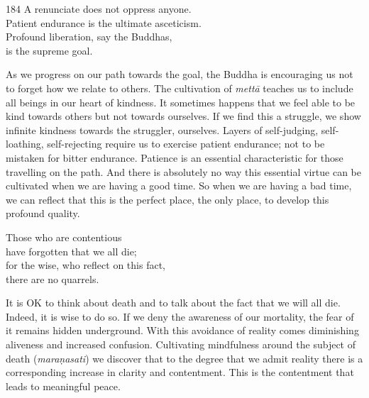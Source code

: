 
\begin{dhpVerse}{184}
\label{dhp-184}
A renunciate does not oppress anyone.\\
Patient endurance is the ultimate asceticism.\\
Profound liberation, say the Buddhas,\\
is the supreme goal.
\end{dhpVerse}

\begin{dhpRefl}

As we progress on our path towards the goal, the Buddha is
encouraging us not to forget how we relate to others. The
cultivation of \emph{mettā} teaches us to include all beings in our heart of
kindness. It sometimes happens that we feel able to be kind towards
others but not towards ourselves. If we find this a struggle, we show
infinite kindness towards the struggler, ourselves. Layers of
self-judging, self-loathing, self-rejecting require us to exercise
patient endurance; not to be mistaken for bitter endurance. Patience
is an essential characteristic for those travelling on the path. And
there is absolutely no way this essential virtue can be cultivated
when we are having a good time. So when we are having a bad time,
we can reflect that this is the perfect place, the only place, to develop
this profound quality.

\end{dhpRefl}


\begin{dhpVerse}{6}
\label{dhp-6}
Those who are contentious\\
have forgotten that we all die;\\
for the wise, who reflect on this fact,\\
there are no quarrels.
\end{dhpVerse}

\begin{dhpRefl}

It is OK to think about death and to talk about the fact that we will all
die. Indeed, it is wise to do so. If we deny the awareness of our
mortality, the fear of it remains hidden underground. With this
avoidance of reality comes diminishing aliveness and increased
confusion. Cultivating mindfulness around the subject of death
(\emph{maraṇasati}) we discover that to the degree that we admit reality there is
a corresponding increase in clarity and contentment. This is the
contentment that leads to meaningful peace.

\end{dhpRefl}

